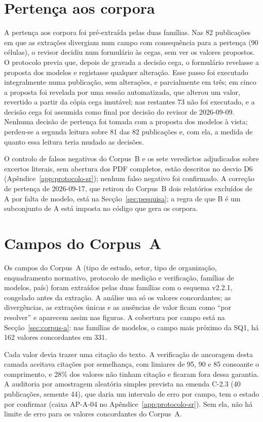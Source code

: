 \section{Pertença aos corpora}
\label{sec:apB-pertenca}

A pertença aos corpora foi pré-extraída pelas duas famílias. Nas 82
publicações em que as extrações divergiam num campo com consequência para a
pertença (90 células), o revisor decidiu num formulário às cegas, sem ver os
valores propostos. O protocolo previa que, depois de gravada a decisão cega,
o formulário revelasse a proposta dos modelos e registasse qualquer
alteração. Esse passo foi executado integralmente numa publicação, sem
alterações, e parcialmente em três; em cinco a proposta foi revelada por uma
sessão automatizada, que alterou um valor, revertido a partir da cópia cega
imutável; nas restantes 73 não foi executado, e a decisão cega foi assumida
como final por decisão do revisor de 2026-09-09. Nenhuma decisão de pertença
foi tomada com a proposta dos modelos à vista; perdeu-se a segunda leitura
sobre 81 das 82 publicações e, com ela, a medida de quanto essa leitura teria
mudado as decisões.

O controlo de falsos negativos do Corpus~B e os sete veredictos adjudicados
sobre excertos literais, sem abertura dos PDF completos, estão descritos no
desvio D6 (Apêndice~\ref{app:protocolo-sr}); nenhum falso negativo foi
confirmado. A correção de pertença de 2026-09-17, que retirou do Corpus~B dois
relatórios excluídos de A por falta de modelo, está na
Secção~\ref{sec:pesquisa}; a regra de que B é um subconjunto de A está
imposta no código que gera os corpora.

\section{Campos do Corpus~A}
\label{sec:apB-corpus-a}

Os campos do Corpus~A (tipo de estudo, setor, tipo de organização,
enquadramento normativo, protocolo de medição e verificação, famílias de
modelos, país) foram extraídos pelas duas famílias com o esquema v2.2.1,
congelado antes da extração. A análise usa só os valores concordantes; as
divergências, as extrações únicas e as ausências de valor ficam como ``por
resolver'' e aparecem assim nas figuras. A cobertura por campo está na
Secção~\ref{sec:corpus-a}: nas famílias de modelos, o campo mais próximo da
SQ1, há 162 valores concordantes em 331.

Cada valor devia trazer uma citação do texto. A verificação de ancoragem
desta camada aceitava citações por semelhança, com limiares de 95, 90 e 85
consoante o comprimento, e 28\% dos valores não tinham citação e ficaram
fora dessa garantia. A auditoria por amostragem aleatória simples prevista na
emenda C-2.3 (40 publicações, semente 44), que daria um intervalo de erro por
campo, tem o estado por confirmar (caixa AP-A-04 no
Apêndice~\ref{app:protocolo-sr}). Sem ela, não há limite de erro para os
valores concordantes do Corpus~A.

